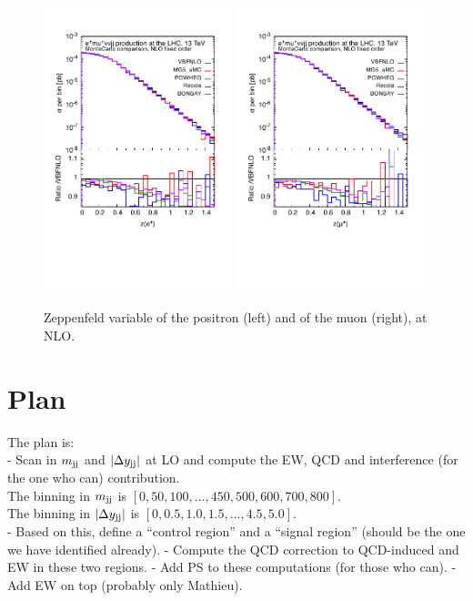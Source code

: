 \documentclass[a4paper,10pt]{report}
\begin{document}
\begin{figure}[h!]
   \centering
   \includegraphics[width=0.49\textwidth,angle=0,clip=true,trim={0.4cm 2.5cm 0.6cm 1.cm}]{figures/ze_NLO.pdf}
   \includegraphics[width=0.49\textwidth,angle=0,clip=true,trim={0.4cm 2.5cm 0.6cm 1.cm}]{figures/zmu_NLO.pdf}
\caption{\label{fig:zel-muNLO}Zeppenfeld variable of the positron (left) and of the muon (right), at NLO.
}
\end{figure}

\section{Plan}

The plan is: \\
- Scan in $m_{\text{j} \text{j}}$ and $|\Delta y_{\text{j} \text{j}}|$ at LO and compute the EW, QCD and interference (for the one who can) contribution. \\
The binning in $m_{\text{j} \text{j}}$ is $\left[ 0, 50, 100, ..., 450, 500, 600, 700, 800 \right] $. \\
The binning in $|\Delta y_{\text{j} \text{j}}|$ is $\left[ 0, 0.5, 1.0, 1.5, ..., 4.5, 5.0 \right] $. \\
- Based on this, define a ``control region'' and a ``signal region'' (should be the one we have identified already).
- Compute the QCD correction to QCD-induced and EW in these two regions.
- Add PS to these computations (for those who can).
- Add EW on top (probably only Mathieu).
\end{document}
